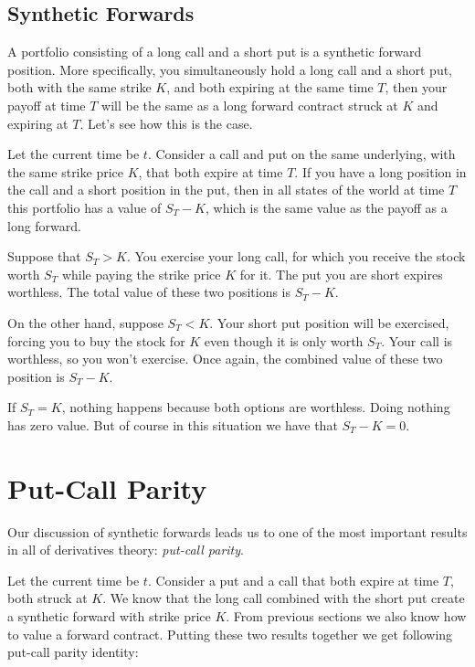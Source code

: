 \documentclass[11pt,]{krantz}
\begin{document}
\subsection{Synthetic Forwards}\label{synthetic-forwards}

A portfolio consisting of a long call and a short put is a synthetic forward position. More specifically, you simultaneously hold a long call and a short put, both with the same strike \(K\), and both expiring at the same time \(T\), then your payoff at time \(T\) will be the same as a long forward contract struck at \(K\) and expiring at \(T\). Let's see how this is the case.

Let the current time be \(t\). Consider a call and put on the same underlying, with the same strike price \(K\), that both expire at time \(T\). If you have a long position in the call and a short position in the put, then in all states of the world at time \(T\) this portfolio has a value of \(S_{T} - K\), which is the same value as the payoff as a long forward.

Suppose that \(S_{T} > K\). You exercise your long call, for which you receive the stock worth \(S_{T}\) while paying the strike price \(K\) for it. The put you are short expires worthless. The total value of these two positions is \(S_{T} - K\).

On the other hand, suppose \(S_{T} < K\). Your short put position will be exercised, forcing you to buy the stock for \(K\) even though it is only worth \(S_{T}\). Your call is worthless, so you won't exercise. Once again, the combined value of these two position is \(S_{T} - K\).

If \(S_{T} = K\), nothing happens because both options are worthless. Doing nothing has zero value. But of course in this situation we have that \(S_{T} - K = 0\).

\section{Put-Call Parity}\label{put-call-parity}

Our discussion of synthetic forwards leads us to one of the most important results in all of derivatives theory: \emph{put-call parity}.

Let the current time be \(t\). Consider a put and a call that both expire at time \(T\), both struck at \(K\). We know that the long call combined with the short put create a synthetic forward with strike price \(K\). From previous sections we also know how to value a forward contract. Putting these two results together we get following put-call parity identity:
\end{document}

